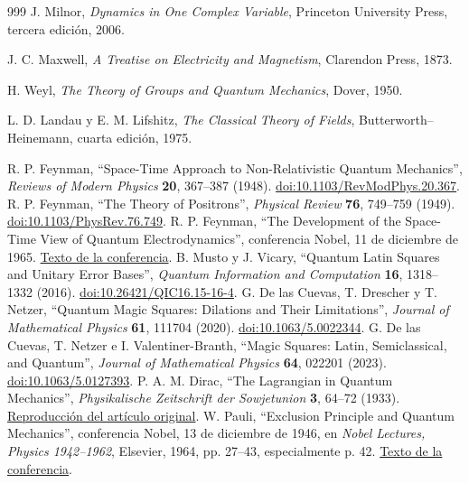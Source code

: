 \begin{thebibliography}{999}
J. Milnor,
\emph{Dynamics in One Complex Variable},
Princeton University Press, tercera edición, 2006.

J. C. Maxwell,
\emph{A Treatise on Electricity and Magnetism},
Clarendon Press, 1873.

H. Weyl,
\emph{The Theory of Groups and Quantum Mechanics},
Dover, 1950.

L. D. Landau y E. M. Lifshitz,
\emph{The Classical Theory of Fields},
Butterworth--Heinemann, cuarta edición, 1975.

 R. P. Feynman, ``Space-Time Approach to Non-Relativistic Quantum Mechanics'', \emph{Reviews of Modern Physics} \textbf{20}, 367--387 (1948). \href{https://doi.org/10.1103/RevModPhys.20.367}{doi:10.1103/RevModPhys.20.367}.
 R. P. Feynman, ``The Theory of Positrons'', \emph{Physical Review} \textbf{76}, 749--759 (1949). \href{https://doi.org/10.1103/PhysRev.76.749}{doi:10.1103/PhysRev.76.749}.
 R. P. Feynman, ``The Development of the Space-Time View of Quantum Electrodynamics'', conferencia Nobel, 11 de diciembre de 1965. \href{https://www.nobelprize.org/prizes/physics/1965/feynman/lecture/}{Texto de la conferencia}.
 B. Musto y J. Vicary, ``Quantum Latin Squares and Unitary Error Bases'', \emph{Quantum Information and Computation} \textbf{16}, 1318--1332 (2016). \href{https://doi.org/10.26421/QIC16.15-16-4}{doi:10.26421/QIC16.15-16-4}.
 G. De las Cuevas, T. Drescher y T. Netzer, ``Quantum Magic Squares: Dilations and Their Limitations'', \emph{Journal of Mathematical Physics} \textbf{61}, 111704 (2020). \href{https://doi.org/10.1063/5.0022344}{doi:10.1063/5.0022344}.
 G. De las Cuevas, T. Netzer e I. Valentiner-Branth, ``Magic Squares: Latin, Semiclassical, and Quantum'', \emph{Journal of Mathematical Physics} \textbf{64}, 022201 (2023). \href{https://doi.org/10.1063/5.0127393}{doi:10.1063/5.0127393}.
 P. A. M. Dirac, ``The Lagrangian in Quantum Mechanics'', \emph{Physikalische Zeitschrift der Sowjetunion} \textbf{3}, 64--72 (1933). \href{https://www.informationphilosopher.com/solutions/scientists/dirac/Lagrangian_1933.pdf}{Reproducción del artículo original}.
 W. Pauli, ``Exclusion Principle and Quantum Mechanics'', conferencia Nobel, 13 de diciembre de 1946, en \emph{Nobel Lectures, Physics 1942--1962}, Elsevier, 1964, pp. 27--43, especialmente p. 42. \href{https://www.nobelprize.org/uploads/2018/06/pauli-lecture.pdf}{Texto de la conferencia}.

\end{thebibliography}
